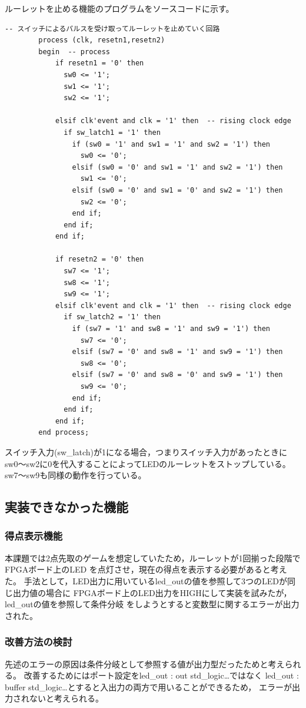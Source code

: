 \documentclass{ltjsarticle}
\begin{document}
		ルーレットを止める機能のプログラムをソースコードに示す。
		\begin{lstlisting}[caption = sample08::ルーレットを止める機能, label = code:rouletteStop]
		  -- スイッチによるパルスを受け取ってルーレットを止めていく回路
		process (clk, resetn1,resetn2)
		begin  -- process
			if resetn1 = '0' then
			  sw0 <= '1';
			  sw1 <= '1';
			  sw2 <= '1';

			elsif clk'event and clk = '1' then  -- rising clock edge
			  if sw_latch1 = '1' then
			    if (sw0 = '1' and sw1 = '1' and sw2 = '1') then
			      sw0 <= '0';
			    elsif (sw0 = '0' and sw1 = '1' and sw2 = '1') then
			      sw1 <= '0';
			    elsif (sw0 = '0' and sw1 = '0' and sw2 = '1') then
			      sw2 <= '0';
			    end if;
			  end if;
			end if;
				
			if resetn2 = '0' then
			  sw7 <= '1';
			  sw8 <= '1';
			  sw9 <= '1';
			elsif clk'event and clk = '1' then  -- rising clock edge
			  if sw_latch2 = '1' then
			    if (sw7 = '1' and sw8 = '1' and sw9 = '1') then
			      sw7 <= '0';
			    elsif (sw7 = '0' and sw8 = '1' and sw9 = '1') then
			      sw8 <= '0';
			    elsif (sw7 = '0' and sw8 = '0' and sw9 = '1') then
			      sw9 <= '0';
			    end if;
			  end if;
		    end if;
		end process;
		\end{lstlisting}
		スイッチ入力(sw\_latch)が1になる場合，つまりスイッチ入力があったときに
		sw0～sw2に0を代入することによってLEDのルーレットをストップしている。
		sw7～sw9も同様の動作を行っている。
	\subsection{実装できなかった機能}
		\subsubsection{得点表示機能}
			本課題では2点先取のゲームを想定していたため，ルーレットが1回揃った段階でFPGAボード上のLED
			を点灯させ，現在の得点を表示する必要があると考えた。
			手法として，LED出力に用いているled\_outの値を参照して3つのLEDが同じ出力値の場合に
			FPGAボード上のLED出力をHIGHにして実装を試みたが，led\_outの値を参照して条件分岐
			をしようとすると変数型に関するエラーが出力された。
		
		\subsubsection{改善方法の検討}
			先述のエラーの原因は条件分岐として参照する値が出力型だったためと考えられる。
			改善するためにはポート設定をled\_out : out std\_logic\dots ではなく
			led\_out : buffer std\_logic\dots とすると入出力の両方で用いることができるため，
			エラーが出力されないと考えられる。
\end{document}
